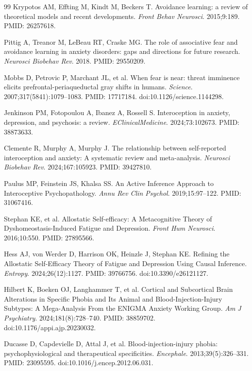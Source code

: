 \documentclass[11pt]{article}
\begin{document}
\begin{thebibliography}{99}
Krypotos AM, Effting M, Kindt M, Beckers T. Avoidance learning: a review of theoretical models and recent developments. \emph{Front Behav Neurosci}. 2015;9:189. PMID: 26257618.

Pittig A, Treanor M, LeBeau RT, Craske MG. The role of associative fear and avoidance learning in anxiety disorders: gaps and directions for future research. \emph{Neurosci Biobehav Rev}. 2018. PMID: 29550209.

Mobbs D, Petrovic P, Marchant JL, et al. When fear is near: threat imminence elicits prefrontal-periaqueductal gray shifts in humans. \emph{Science}. 2007;317(5841):1079--1083. PMID: 17717184. doi:10.1126/science.1144298.

Jenkinson PM, Fotopoulou A, Ibanez A, Rossell S. Interoception in anxiety, depression, and psychosis: a review. \emph{EClinicalMedicine}. 2024;73:102673. PMID: 38873633.

Clemente R, Murphy A, Murphy J. The relationship between self-reported interoception and anxiety: A systematic review and meta-analysis. \emph{Neurosci Biobehav Rev}. 2024;167:105923. PMID: 39427810.

Paulus MP, Feinstein JS, Khalsa SS. An Active Inference Approach to Interoceptive Psychopathology. \emph{Annu Rev Clin Psychol}. 2019;15:97--122. PMID: 31067416.

Stephan KE, et al. Allostatic Self-efficacy: A Metacognitive Theory of Dyshomeostasis-Induced Fatigue and Depression. \emph{Front Hum Neurosci}. 2016;10:550. PMID: 27895566.

Hess AJ, von Werder D, Harrison OK, Heinzle J, Stephan KE. Refining the Allostatic Self-Efficacy Theory of Fatigue and Depression Using Causal Inference. \emph{Entropy}. 2024;26(12):1127. PMID: 39766756. doi:10.3390/e26121127.

Hilbert K, Boeken OJ, Langhammer T, et al. Cortical and Subcortical Brain Alterations in Specific Phobia and Its Animal and Blood-Injection-Injury Subtypes: A Mega-Analysis From the ENIGMA Anxiety Working Group. \emph{Am J Psychiatry}. 2024;181(8):728--740. PMID: 38859702. doi:10.1176/appi.ajp.20230032.

Ducasse D, Capdevielle D, Attal J, et al. Blood-injection-injury phobia: psychophysiological and therapeutical specificities. \emph{Encephale}. 2013;39(5):326--331. PMID: 23095595. doi:10.1016/j.encep.2012.06.031.


\end{thebibliography}
\end{document}
